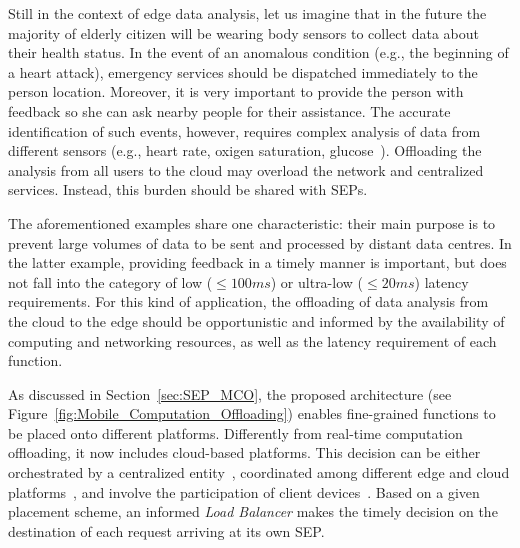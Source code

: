 \documentclass[letterpaper, 10 pt, conference]{ieeeconf}  %
\begin{document}
Still in the context of edge data analysis, 
let us imagine that in the future the majority of elderly citizen will be wearing body sensors to collect data about their health status. In the event of an anomalous condition (e.g., the beginning of a heart attack), emergency services should be dispatched immediately to the person location. Moreover, it is very important to provide the person with feedback so she can ask nearby people for their assistance.
The accurate identification of such events, however, requires complex analysis of data from different sensors (e.g., heart rate, oxigen saturation, glucose~\cite{Li:2017}). Offloading the analysis from all users to the cloud may overload the network and centralized services. Instead, this burden should be shared with SEPs.%

The aforementioned examples share one characteristic: their main purpose is to prevent large volumes of data to be sent and processed by distant data centres. In the latter example, providing feedback in a timely manner is important, but does not fall into the category of low ($\leq 100ms$) or ultra-low ($\leq 20ms$) latency requirements. For this kind of application, the offloading of data analysis from the cloud to the edge should be opportunistic and informed by the availability of computing and networking resources, as well as the latency requirement of each function.

As discussed in Section~\ref{sec:SEP_MCO}, the proposed architecture (see Figure~\ref{fig:Mobile_Computation_Offloading}) enables fine-grained functions to be placed onto different platforms. Differently from real-time computation offloading, it now includes cloud-based platforms. This decision can be either orchestrated by a centralized entity~\cite{Taleb:2013}, coordinated among different edge and cloud platforms~\cite{Mach:2017}, and involve the participation of client devices~\cite{OrsiniBL16,Luciano:2018}. Based on a given placement scheme, an informed \textit{Load Balancer} makes the timely decision on the destination of each request arriving at its own SEP.

\end{document}
